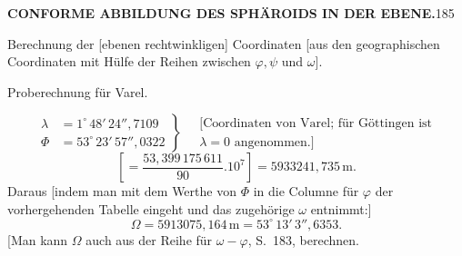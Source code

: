 \par\clearpage
\noindent\null\hfill{\small\textbf{CONFORME ABBILDUNG DES SPHÄROIDS IN DER EBENE.}}\hfill185\par\medskip
{\centering [29.]\par\medskip
Berechnung der [ebenen rechtwinkligen] Coordinaten [aus den geographischen\\
Coordinaten mit Hülfe der Reihen zwischen \(\varphi,\psi\) und \(\omega\)].\par\smallskip
Proberechnung für Varel.\par}
\[
\left.\begin{aligned}
\lambda&=1^\circ\,48'\,24''{,}7109\\
\Phi&=53^\circ\,23'\,57''{,}0322
\end{aligned}\right\}\quad
\begin{gathered}
\text{[Coordinaten von Varel; für Göttingen ist}\\
\lambda=0\text{ angenommen.]}
\end{gathered}
\]
\[
\left[=\frac{53{,}399\,175\,611}{90}.10^7\right]=5933241{,}735\,\mathrm{m}.
\]
Daraus [indem man mit dem Werthe von \(\Phi\) in die Columne für \(\varphi\) der vorhergehenden Tabelle eingeht und das zugehörige \(\omega\) entnimmt:]
\[
\Omega=5913075{,}164\,\mathrm{m}=53^\circ\,13'\,3''{,}6353.
\]
[Man kann \(\Omega\) auch aus der Reihe für \(\omega-\varphi\), S.~183, berechnen.

